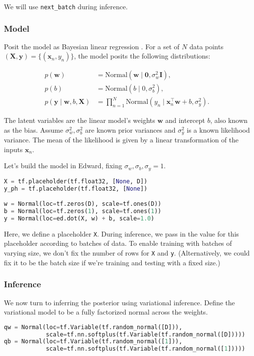 We will use \texttt{next_batch} during inference.

\subsubsection{Model}

Posit the model as Bayesian linear regression \citep{murphy2012machine}.
For a set of $N$ data points $(\mathbf{X},\mathbf{y})=\{(\mathbf{x}_n, y_n)\}$,
the model posits the following distributions:

\begin{align*}
  p(\mathbf{w})
  &=
  \text{Normal}(\mathbf{w} \mid \mathbf{0}, \sigma_w^2\mathbf{I}),
  \\[1.5ex]
  p(b)
  &=
  \text{Normal}(b \mid 0, \sigma_b^2),
  \\
  p(\mathbf{y} \mid \mathbf{w}, b, \mathbf{X})
  &=
  \prod_{n=1}^N
  \text{Normal}(y_n \mid \mathbf{x}_n^\top\mathbf{w} + b, \sigma_y^2).
\end{align*}

The latent variables are the linear model's weights $\mathbf{w}$ and
intercept $b$, also known as the bias.
Assume $\sigma_w^2,\sigma_b^2$ are known prior variances and $\sigma_y^2$ is a
known likelihood variance. The mean of the likelihood is given by a
linear transformation of the inputs $\mathbf{x}_n$.

Let's build the model in Edward, fixing $\sigma_w,\sigma_b,\sigma_y=1$.

\begin{lstlisting}[language=Python]
X = tf.placeholder(tf.float32, [None, D])
y_ph = tf.placeholder(tf.float32, [None])

w = Normal(loc=tf.zeros(D), scale=tf.ones(D))
b = Normal(loc=tf.zeros(1), scale=tf.ones(1))
y = Normal(loc=ed.dot(X, w) + b, scale=1.0)
\end{lstlisting}

Here, we define a placeholder \texttt{X}. During inference, we pass in
the value for this placeholder according to batches of data.
To enable training with batches of varying size,
we don't fix the number of rows for \texttt{X} and \texttt{y}. (Alternatively,
we could fix it to be the batch size if we're training and testing
with a fixed size.)

\subsubsection{Inference}

We now turn to inferring the posterior using variational inference.
Define the variational model to be a fully factorized normal across
the weights.
\begin{lstlisting}[language=Python]
qw = Normal(loc=tf.Variable(tf.random_normal([D])),
            scale=tf.nn.softplus(tf.Variable(tf.random_normal([D]))))
qb = Normal(loc=tf.Variable(tf.random_normal([1])),
            scale=tf.nn.softplus(tf.Variable(tf.random_normal([1]))))
\end{lstlisting}

